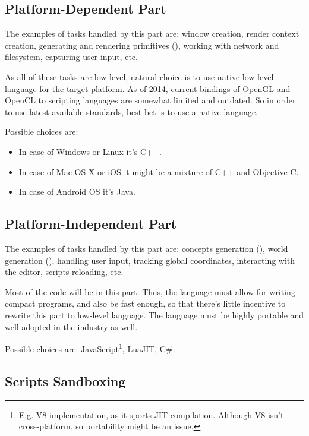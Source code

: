 \documentclass[12pt]{article}
\begin{document}
\subsection{Platform-Dependent Part}

The examples of tasks handled by this part are:
window creation, render context creation, generating and rendering primitives
(), working with network and filesystem, capturing
user input, etc.

As all of these tasks are low-level, natural choice is to use native low-level
language for the target platform.
As of 2014, current bindings of OpenGL and OpenCL to scripting languages are
somewhat limited and outdated.
So in order to use latest available standards, best bet is to use a native
language.

Possible choices are:

\begin{itemize}
    \item In case of Windows or Linux it's C++.
    \item In case of Mac OS X or iOS it might be a mixture of C++ and
        Objective C.
    \item In case of Android OS it's Java.
\end{itemize}

\subsection{Platform-Independent Part}

The examples of tasks handled by this part are:
concepts generation (),
world generation (),
handling user input, tracking global coordinates,
interacting with the editor, scripts reloading, etc.

Most of the code will be in this part.
Thus, the language must allow for writing compact programs, and also
be fast enough, so that there's little incentive to rewrite this part to
low-level language.
The language must be highly portable and well-adopted in the industry as well.

Possible choices are:
JavaScript\footnote{
    E.g. V8 implementation, as it sports JIT compilation.
    Although V8 isn't cross-platform, so portability might be an issue.
}, LuaJIT, C\#.

\subsection{Scripts Sandboxing}
\end{document}
